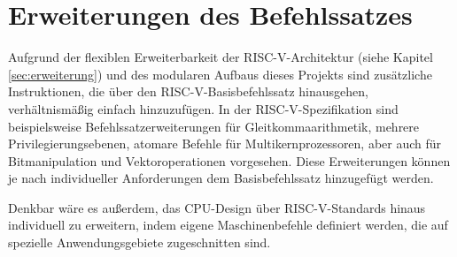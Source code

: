 \section{Erweiterungen des Befehlssatzes}

Aufgrund der flexiblen Erweiterbarkeit der RISC-V-Architektur (siehe
Kapitel \ref{sec:erweiterung}) und des modularen Aufbaus dieses Projekts
sind zusätzliche Instruktionen, die über den RISC-V-Basisbefehlssatz
hinausgehen, verhältnismäßig einfach hinzuzufügen. In der
RISC-V-Spezifikation sind beispielsweise Befehlssatzerweiterungen für
Gleitkommaarithmetik, mehrere Privilegierungsebenen, atomare Befehle für
Multikernprozessoren, aber auch für Bitmanipulation und
Vektoroperationen vorgesehen. \cite[S. 4f.]{RISC} Diese Erweiterungen
können je nach individueller Anforderungen dem Basisbefehlssatz hinzugefügt werden.
 
Denkbar wäre es außerdem, das CPU-Design über RISC-V-Standards hinaus individuell zu erweitern, indem eigene Maschinenbefehle definiert werden, die auf spezielle Anwendungsgebiete zugeschnitten sind.



